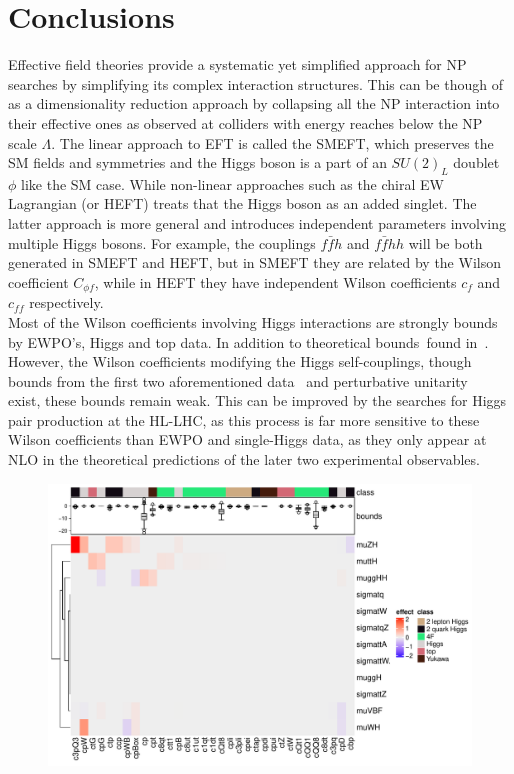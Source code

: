 \section{Conclusions \label{sec:concefts}}
Effective field theories provide a systematic yet simplified approach for NP searches by simplifying its complex interaction structures. This can be though of as a dimensionality reduction approach by collapsing all the NP interaction into their effective ones as observed at colliders with energy reaches below the NP scale $\Lambda$. The linear approach to EFT is called the SMEFT, which preserves the SM fields and symmetries and the Higgs boson is a part of an $SU(2)_L$ doublet $\phi$ like the SM case. While non-linear approaches such as the chiral EW Lagrangian (or HEFT) treats that the Higgs boson as an added singlet. The latter approach is more general and introduces independent parameters involving multiple Higgs bosons. For example, the couplings $f\bar f h$ and $ f\bar f hh$ will be both generated in SMEFT and HEFT, but in SMEFT they are related by the Wilson coefficient $C_{\phi f}$, while in HEFT they have  independent  Wilson coefficients $c_f$ and $c_{ff}$ respectively. \\  Most of the Wilson coefficients involving Higgs interactions are strongly bounds by EWPO's, Higgs and top data. In addition to theoretical bounds~found in~\cite{Falkowski:2019tft}. However, the Wilson coefficients modifying the Higgs self-couplings, though bounds from the first two aforementioned data~ and perturbative unitarity ~\cite{DiLuzio:2017tfn,DiVita:2017vrr} exist, these bounds remain weak. This can be improved by the searches for Higgs pair production at the HL-LHC, as this process is far more sensitive to these Wilson coefficients than EWPO and single-Higgs data, as they only appear at NLO in the theoretical predictions of the later two experimental observables.
\begin{figure}[htbp!]
	\begin{center}
		\includegraphics[width=\textwidth]{figures/smeft_heatmap}
		\caption{ \label{fig:greatheatmap} }
	\end{center}
\end{figure}
